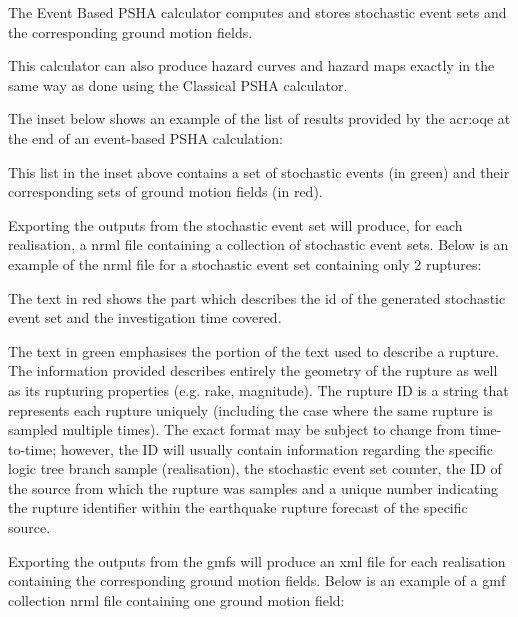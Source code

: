 The Event Based PSHA calculator computes and stores stochastic event sets and
the corresponding ground motion fields.

This calculator can also produce hazard curves and hazard maps exactly in the
same way as done using the Classical PSHA calculator.

The inset below shows an example of the list of results provided by the
\gls{acr:oqe} at the end of an event-based PSHA calculation:



This list in the inset above contains a set of stochastic events (in green)
and their corresponding sets of ground motion fields (in red).

Exporting the outputs from the stochastic event set will produce, for each realisation, a nrml file containing a collection of stochastic
event sets. Below is an example of the nrml file for a stochastic event set containing only 2 ruptures:



The text in red shows the part which describes the id of the generated
stochastic event set and the investigation time covered.

The text in green emphasises the portion of the text used to describe a
rupture. The information provided describes entirely the geometry of the rupture as well as its rupturing properties (e.g. rake, magnitude). The rupture ID is a string that represents each rupture uniquely (including the case where the same rupture is sampled multiple times). The exact format may be subject to change from time-to-time; however, the ID will usually contain information regarding the specific logic tree branch sample (realisation), the stochastic event set counter, the ID of the source from which the rupture was samples and a unique number indicating the rupture identifier within the earthquake rupture forecast of the specific source.

Exporting the outputs from the gmfs will produce an xml file for each realisation containing the corresponding ground motion fields. Below is an example of a gmf collection nrml file containing one ground motion field:


